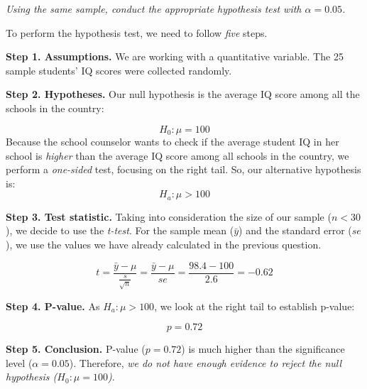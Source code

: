 \documentclass[12pt,letterpaper]{article}
\begin{document}
\begin{enumerate}
		\textit{Using the same sample, conduct the appropriate hypothesis test with $\alpha=0.05$.}
		
		\vspace{1cm}
		
		To perform the hypothesis test, we need to follow \textit{five} steps.
		
		\vspace{.5cm}
		
		\textbf{Step 1. Assumptions.} We are working with a quantitative variable. The 25 sample students' IQ scores were collected randomly.
		
		\vspace{.5cm}
		
		\textbf{Step 2. Hypotheses.} Our null hypothesis is the average IQ score among all the schools in the country:
		
		$$H_0: \mu = 100$$
		Because the school counselor wants to check if the average student IQ in her school is \textit{higher} than the average IQ score among all schools in the country, we perform a \textit{one-sided} test, focusing on the right tail. So, our alternative hypothesis is: $$H_a: \mu > 100$$
		
		\vspace{.5cm}
		
		\textbf{Step 3. Test statistic.} Taking into consideration the size of our sample ($n < 30$), we decide to use the \textit{t-test}. For the sample mean ($\bar{y}$) and the standard error ($se$), we use the values we have already calculated in the previous question.
		
		$$t = \frac{\bar{y} - \mu}{\frac{s}{\sqrt{n}}} = \frac{\bar{y} - \mu}{se} = \frac{98.4 - 100}{2.6} = -0.62$$
		
		\vspace{.5cm}
		
		\textbf{Step 4. P-value.} As $H_a: \mu > 100$, we look at the right tail to establish p-value:
		
		$$p = 0.72$$
		
		\vspace{.5cm}
				
		\textbf{Step 5. Conclusion.} P-value ($p=0.72$) is much higher than the significance level ($\alpha=0.05$). Therefore, \textit{we do not have enough evidence to reject the null hypothesis ($H_0: \mu = 100$)}.
				
	\end{enumerate}
	
\end{document}
